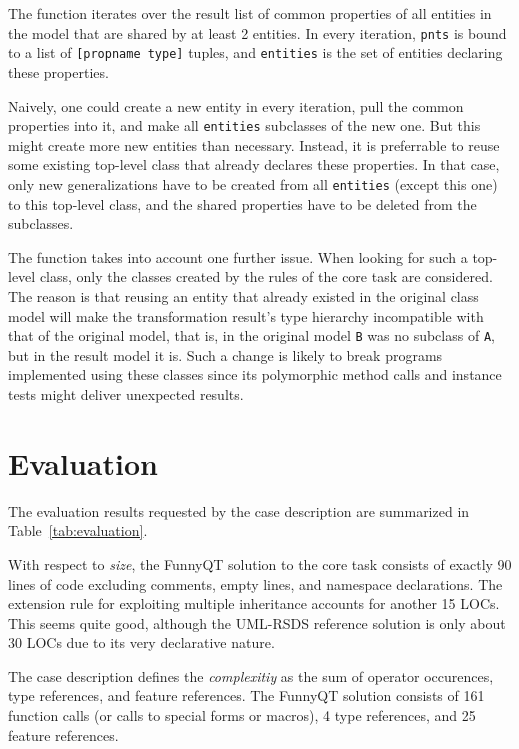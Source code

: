 \documentclass[submission]{eptcs}
\begin{document}
\begin{sloppypar}
  The function iterates over the result list of common properties of all
  entities in the model that are shared by at least 2 entities.  In every
  iteration, \verb|pnts| is bound to a list of \verb|[propname type]| tuples,
  and \verb|entities| is the set of entities declaring these properties.
\end{sloppypar}

Naively, one could create a new entity in every iteration, pull the common
properties into it, and make all \verb|entities| subclasses of the new one.
But this might create more new entities than necessary.  Instead, it is
preferrable to reuse some existing top-level class that already declares these
properties.  In that case, only new generalizations have to be created from all
\verb|entities| (except this one) to this top-level class, and the shared
properties have to be deleted from the subclasses.

The function takes into account one further issue.  When looking for such a
top-level class, only the classes created by the rules of the core task are
considered.  The reason is that reusing an entity that already existed in the
original class model will make the transformation result's type hierarchy
incompatible with that of the original model, that is, in the original model
\verb|B| was no subclass of \verb|A|, but in the result model it is.  Such a
change is likely to break programs implemented using these classes since its
polymorphic method calls and instance tests might deliver unexpected results.


\section{Evaluation}
\label{sec:evaluation}

The evaluation results requested by the case description
\cite{cdrestructcasedesc} are summarized in Table~\ref{tab:evaluation}.

With respect to \emph{size}, the FunnyQT solution to the core task consists of
exactly 90 lines of code excluding comments, empty lines, and namespace
declarations.  The extension rule for exploiting multiple inheritance accounts
for another 15 LOCs.  This seems quite good, although the UML-RSDS reference
solution is only about 30 LOCs due to its very declarative nature.

The case description defines the \emph{complexitiy} as the sum of operator
occurences, type references, and feature references.  The FunnyQT solution
consists of 161 function calls (or calls to special forms or macros), 4 type
references, and 25 feature references.
\end{document}
